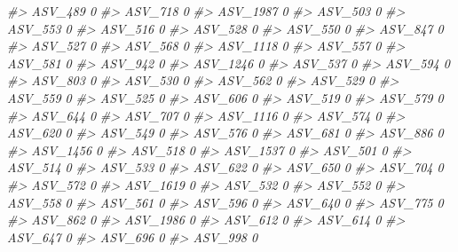 \documentclass[
]{article}
\newenvironment{Shaded}{\begin{snugshade}}{\end{snugshade}}
\newcommand{\CommentTok}[1]{\textcolor[rgb]{0.56,0.35,0.01}{\textit{#1}}}
\begin{document}
\begin{Shaded}
\begin{Highlighting}[]
\CommentTok{\#\textgreater{} ASV\_489   0}
\CommentTok{\#\textgreater{} ASV\_718   0}
\CommentTok{\#\textgreater{} ASV\_1987  0}
\CommentTok{\#\textgreater{} ASV\_503   0}
\CommentTok{\#\textgreater{} ASV\_553   0}
\CommentTok{\#\textgreater{} ASV\_516   0}
\CommentTok{\#\textgreater{} ASV\_528   0}
\CommentTok{\#\textgreater{} ASV\_550   0}
\CommentTok{\#\textgreater{} ASV\_847   0}
\CommentTok{\#\textgreater{} ASV\_527   0}
\CommentTok{\#\textgreater{} ASV\_568   0}
\CommentTok{\#\textgreater{} ASV\_1118  0}
\CommentTok{\#\textgreater{} ASV\_557   0}
\CommentTok{\#\textgreater{} ASV\_581   0}
\CommentTok{\#\textgreater{} ASV\_942   0}
\CommentTok{\#\textgreater{} ASV\_1246  0}
\CommentTok{\#\textgreater{} ASV\_537   0}
\CommentTok{\#\textgreater{} ASV\_594   0}
\CommentTok{\#\textgreater{} ASV\_803   0}
\CommentTok{\#\textgreater{} ASV\_530   0}
\CommentTok{\#\textgreater{} ASV\_562   0}
\CommentTok{\#\textgreater{} ASV\_529   0}
\CommentTok{\#\textgreater{} ASV\_559   0}
\CommentTok{\#\textgreater{} ASV\_525   0}
\CommentTok{\#\textgreater{} ASV\_606   0}
\CommentTok{\#\textgreater{} ASV\_519   0}
\CommentTok{\#\textgreater{} ASV\_579   0}
\CommentTok{\#\textgreater{} ASV\_644   0}
\CommentTok{\#\textgreater{} ASV\_707   0}
\CommentTok{\#\textgreater{} ASV\_1116  0}
\CommentTok{\#\textgreater{} ASV\_574   0}
\CommentTok{\#\textgreater{} ASV\_620   0}
\CommentTok{\#\textgreater{} ASV\_549   0}
\CommentTok{\#\textgreater{} ASV\_576   0}
\CommentTok{\#\textgreater{} ASV\_681   0}
\CommentTok{\#\textgreater{} ASV\_886   0}
\CommentTok{\#\textgreater{} ASV\_1456  0}
\CommentTok{\#\textgreater{} ASV\_518   0}
\CommentTok{\#\textgreater{} ASV\_1537  0}
\CommentTok{\#\textgreater{} ASV\_501   0}
\CommentTok{\#\textgreater{} ASV\_514   0}
\CommentTok{\#\textgreater{} ASV\_533   0}
\CommentTok{\#\textgreater{} ASV\_622   0}
\CommentTok{\#\textgreater{} ASV\_650   0}
\CommentTok{\#\textgreater{} ASV\_704   0}
\CommentTok{\#\textgreater{} ASV\_572   0}
\CommentTok{\#\textgreater{} ASV\_1619  0}
\CommentTok{\#\textgreater{} ASV\_532   0}
\CommentTok{\#\textgreater{} ASV\_552   0}
\CommentTok{\#\textgreater{} ASV\_558   0}
\CommentTok{\#\textgreater{} ASV\_561   0}
\CommentTok{\#\textgreater{} ASV\_596   0}
\CommentTok{\#\textgreater{} ASV\_640   0}
\CommentTok{\#\textgreater{} ASV\_775   0}
\CommentTok{\#\textgreater{} ASV\_862   0}
\CommentTok{\#\textgreater{} ASV\_1986  0}
\CommentTok{\#\textgreater{} ASV\_612   0}
\CommentTok{\#\textgreater{} ASV\_614   0}
\CommentTok{\#\textgreater{} ASV\_647   0}
\CommentTok{\#\textgreater{} ASV\_696   0}
\CommentTok{\#\textgreater{} ASV\_998   0}

\end{Highlighting}
\end{Shaded}
\end{document}
